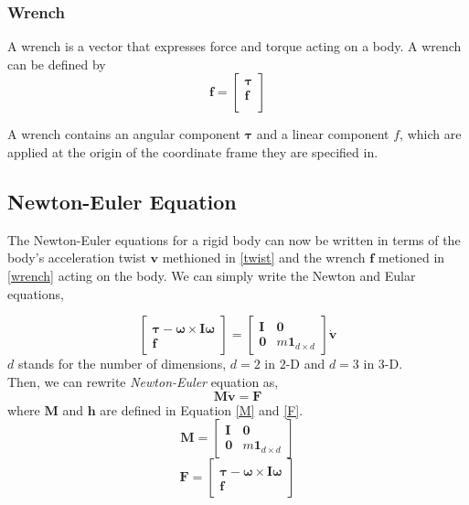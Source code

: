     \subsubsection{Wrench}
        A wrench is a vector that expresses force and torque acting on a body. A wrench can be defined by
        \begin{equation}
            \mathbf{f} = \left[ \begin{array}{c} \pmb{\tau} \\ \pmb{f} \\ \end{array} \right]
            \label{wrench} 
        \end{equation}

        A wrench contains an angular component $\pmb{\tau}$ and a linear component $f$, which are applied at the origin of the coordinate frame they are specified in.


\subsection{Newton-Euler Equation}
    The Newton-Euler equations for a rigid body can now be written in terms of the body's acceleration twist $\mathbf{v}$ methioned in \ref{twist} and the wrench $\mathbf{f}$ metioned in \ref{wrench} acting on the body. We can simply write the Newton and Eular equations,

    \begin{equation}
        \left[ \begin{array}{c} \pmb{\tau} - \pmb{\omega} \times \pmb{I} \pmb{\omega}\\ \pmb{f} \end{array}\right] = \left[ \begin{array}{cc} \pmb{I} & \pmb{0} \\ \pmb{0}& m\pmb{1}_{d\times d}\end{array} \right] \dot{\mathbf{v}}
    \end{equation}
    $d$ stands for the number of dimensions, $d=2$ in $2$-D and $d=3$ in $3$-D. \\

    Then, we can rewrite \textit{Newton-Euler} equation as,
    \begin{equation}
        \pmb{M}\dot{\mathbf{v}} = \mathbf{F}
    \end{equation}
    where $\pmb{M}$ and $\mathbf{h}$ are defined in Equation \ref{M} and \ref{F}.
    \begin{equation}
        \pmb{M} = \left[ \begin{array}{cc} \pmb{I} & \pmb{0} \\ \pmb{0} & m\pmb{1}_{d \times d}\end{array} \right]
        \label{M}
    \end{equation}
    \begin{equation}
        \mathbf{F} = \left[ \begin{array}{c} \pmb{\tau} - \pmb{\omega} \times \pmb{I} \pmb{\omega}\\ \pmb{f} \end{array}\right]
        \label{F}
    \end{equation}

